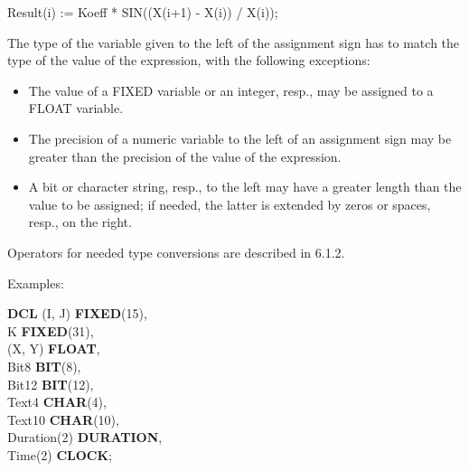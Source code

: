 Result(i) := Koeff * SIN((X(i+1) - X(i)) / X(i));

The type of the variable given to the left of the assignment sign has to
match the type of the value of the expression, with the following
exceptions:
\begin{itemize}
\item The value of a FIXED variable or an integer, resp., may be
assigned to a FLOAT variable.
\item The precision of a numeric variable to the left of an assignment
sign may be greater than the precision of the value of the expression.
\item A bit or character string, resp., to the left may have a greater
length than the value to be assigned; if needed, the latter is extended
by zeros or spaces, resp., on the right.
\end{itemize}

Operators for needed type conversions are described in 6.1.2.

Examples:

{\bf DCL} (I, J) {\bf FIXED}(15),\\
\x K {\bf FIXED}(31),\\
\x (X, Y) {\bf FLOAT},\\
\x Bit8 {\bf BIT}(8),\\
\x Bit12 {\bf BIT}(12),\\
\x Text4 {\bf CHAR}(4),\\
\x Text10 {\bf CHAR}(10),\\
\x Duration(2) {\bf DURATION},\\
\x Time(2) {\bf CLOCK};

